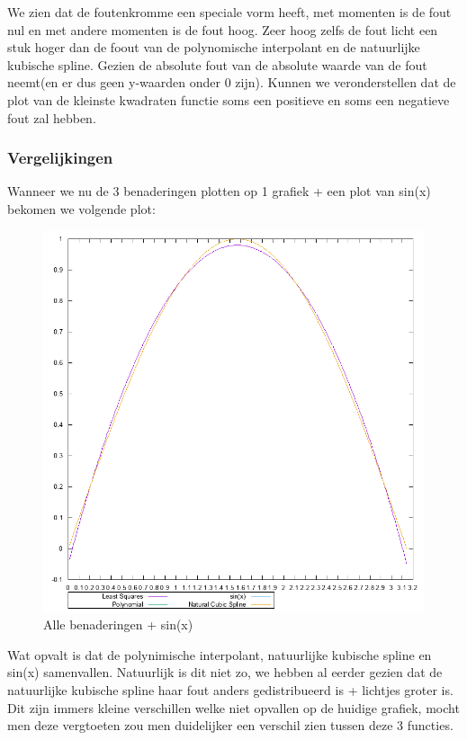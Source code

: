 \documentclass[10pt,a4paper]{article}
\begin{document}
We zien dat de foutenkromme een speciale vorm heeft, met momenten is de fout nul en met andere momenten is de fout hoog. Zeer hoog zelfs de fout licht een stuk hoger dan de foout van de polynomische interpolant en de natuurlijke kubische spline. Gezien de absolute fout van de absolute waarde van de fout neemt(en er dus geen y-waarden onder 0 zijn). Kunnen we veronderstellen dat de plot van de kleinste kwadraten functie soms een positieve en soms een negatieve fout zal hebben.
\subsubsection{Vergelijkingen}
Wanneer we nu de 3 benaderingen plotten op 1 grafiek + een plot van sin(x) bekomen we volgende plot:
\begin{figure}[H]
\centering
\includegraphics[scale= 0.7]{../Onegraphs/All.png}
\caption{Alle benaderingen + sin(x)}
\end{figure}
Wat opvalt is dat de polynimische interpolant, natuurlijke kubische spline en sin(x) samenvallen. Natuurlijk is dit niet zo, we hebben al eerder gezien dat de natuurlijke kubische spline haar fout anders gedistribueerd is + lichtjes groter is. Dit zijn immers kleine verschillen welke niet opvallen op de huidige grafiek, mocht men deze vergtoeten zou men duidelijker een verschil zien tussen deze 3 functies.
\end{document}
